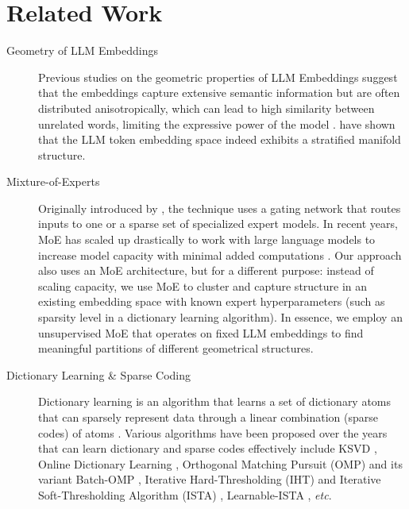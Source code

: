 \section{Related Work}
\begin{description}
    \item[Geometry of LLM Embeddings] Previous studies on the geometric properties of LLM Embeddings suggest that the embeddings capture extensive semantic information but are often distributed anisotropically, which can lead to high similarity between unrelated words, limiting the expressive power of the model \cite{anisotropic}. \citeauthor{token-strats} have shown that the LLM token embedding space indeed exhibits a stratified manifold structure.
    \item[Mixture-of-Experts] Originally introduced by \citeauthor{moe}, the technique uses a gating network that routes inputs to one or a sparse set of specialized expert models. In recent years, MoE has scaled up drastically to work with large language models to increase model capacity with minimal added computations \cite{moe-llm}. Our approach also uses an MoE architecture, but for a different purpose: instead of scaling capacity, we use MoE to cluster and capture structure in an existing embedding space with known expert hyperparameters (such as sparsity level in a dictionary learning algorithm). In essence, we employ an unsupervised MoE that operates on fixed LLM embeddings to find meaningful partitions of different geometrical structures.
    \item[Dictionary Learning \& Sparse Coding] Dictionary learning is an algorithm that learns a set of dictionary atoms that can sparsely represent data through a linear combination (sparse codes) of atoms \cite{dl}. Various algorithms have been proposed over the years that can learn dictionary and sparse codes effectively include KSVD \cite{ksvd, ksvd-efficient}, Online Dictionary Learning \cite{odl}, Orthogonal Matching Pursuit (OMP) and its variant Batch-OMP \cite{omp, ksvd-efficient}, Iterative Hard-Thresholding (IHT) and Iterative Soft-Thresholding Algorithm (ISTA) \cite{cs}, Learnable-ISTA \cite{lista}, \textit{etc}.
\end{description}